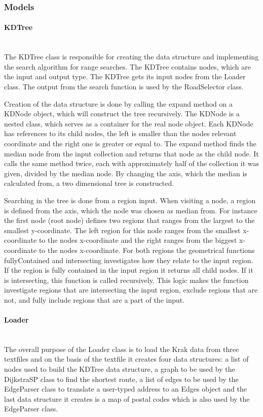 \documentclass[a4paper,10pt,titlepage]{article}
\begin{document}
			\subsubsection{Models}
			
				\paragraph{KDTree}\mbox{}\\
				The KDTree class is responsible for creating the data structure and implementing the search algorithm for range searches. The KDTree contains nodes, which are the input and output type. The KDTree gets its input nodes from the Loader class. The output from the search function is used by the RoadSelector class.

Creation of the data structure is done by calling the expand method on a KDNode object, which will construct the tree recursively. The KDNode is a nested class, which serves as a container for the real node object. Each KDNode has references to its child nodes, the left is smaller than the nodes relevant coordinate and the right one is greater or equal to. The expand method finds the median node from the input collection and returns that node as the child node. It calls the same method twice, each with approximately half of the collection it was given, divided by the median node. By changing the axis, which the median is calculated from, a two dimensional tree is constructed.

Searching in the tree is done from a region input. When visiting a node, a region is defined from the axis, which the node was chosen as median from. For instance the first node (root node) defines two regions that ranges from the largest to the smallest y-coordinate. The left region for this node ranges from the smallest x-coordinate to the nodes x-coordinate and the right ranges from the biggest x-coordinate to the nodes x-coordinate. For both regions the geometrical functions fullyContained and intersecting investigates how they relate to the input region. If the region is fully contained in the input region it returns all child nodes. If it is intersecting, this function is called recursively. This logic makes the function investigate regions that are intersecting the input region, exclude regions that are not, and fully include regions that are a part of the input.

				
				\paragraph{Loader}\mbox{}\\
The overall purpose of the Loader class is to load the Krak data from three textfiles and on the basis of the textfile it creates four data structures: a list of nodes used to build the KDTree data structure, a graph to be used by the DijkstraSP class to find the shortest route, a list of edges to be used by the EdgeParser class to translate a user-typed address to an Edges object and the last data structure it creates is a map of postal codes which is also used by the EdgeParser class.
\end{document}
